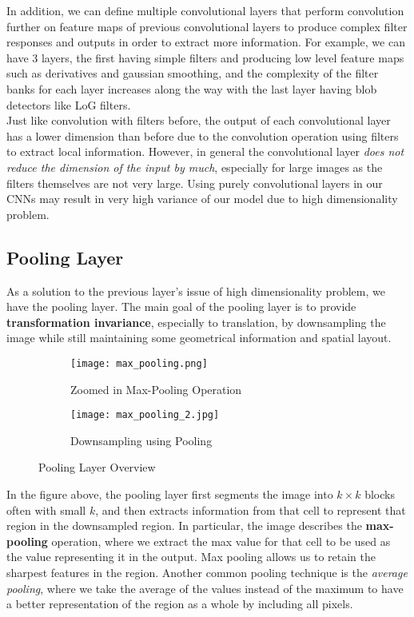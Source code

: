 \documentclass[12pt]{article}
\begin{document}
In addition, we can define multiple convolutional layers that perform convolution further on feature maps of previous convolutional layers to produce complex filter responses and outputs in order to extract more information. For example, we can have 3 layers, the first having simple filters and producing low level feature maps such as derivatives and gaussian smoothing, and the complexity of the filter banks for each layer increases along the way with the last layer having blob detectors like LoG filters.\\

Just like convolution with filters before, the output of each convolutional layer has a lower dimension than before due to the convolution operation using filters to extract local information. However, in general the convolutional layer \textit{does not reduce the dimension of the input by much}, especially for large images as the filters themselves are not very large. Using purely convolutional layers in our CNNs may result in very high variance of our model due to high dimensionality problem. 

\subsection{Pooling Layer}

As a solution to the previous layer's issue of high dimensionality problem, we have the pooling layer. The main goal of the pooling layer is to provide \textbf{transformation invariance}, especially to translation, by downsampling the image while still maintaining some geometrical information and spatial layout.

\begin{figure}[!htb]
\centering
\begin{subfigure}{.5\textwidth}
  \centering
  \texttt{[image: max\_pooling.png]}
  \caption{Zoomed in Max-Pooling Operation}
  \label{fig:sub1}
\end{subfigure}%
\begin{subfigure}{.5\textwidth}
  \centering
  \texttt{[image: max\_pooling\_2.jpg]}
  \caption{Downsampling using Pooling}
  \label{fig:sub2}
\end{subfigure}
\caption{Pooling Layer Overview}
\label{fig:test}
\end{figure}

In the figure above, the pooling layer first segments the image into $k \times k$ blocks often with small $k$, and then extracts information from that cell to represent that region in the downsampled region. In particular, the image describes the \textbf{max-pooling} operation, where we extract the max value for that cell to be used as the value representing it in the output. Max pooling allows us to retain the sharpest features in the region. Another common pooling technique is the \textit{average pooling}, where we take the average of the values instead of the maximum to have a better representation of the region as a whole by including all pixels. \\
\end{document}
